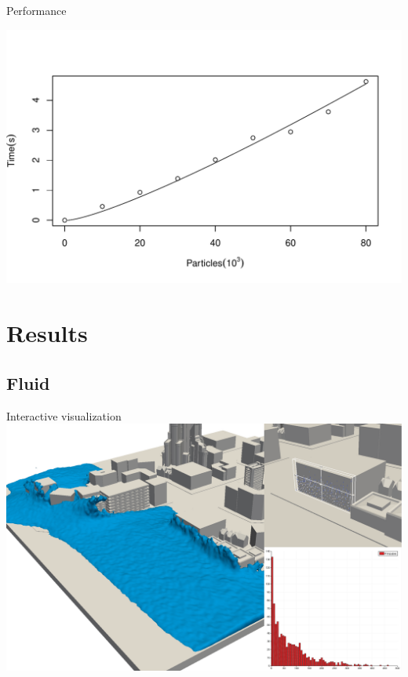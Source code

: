 \documentclass[8pt,sans,mathserif,aspectratio=43]{beamer}
\begin{document}
\begin{frame}{Performance}
  \begin{center}
    \includegraphics[width=\textwidth]{figures/performance-pt.pdf}
  \end{center}
\end{frame}


\section{Results}

\subsection{Fluid}

\begin{frame}{Interactive visualization}
  \includegraphics[width=\textwidth]{figures/paraview.png}
\end{frame}
\end{document}
